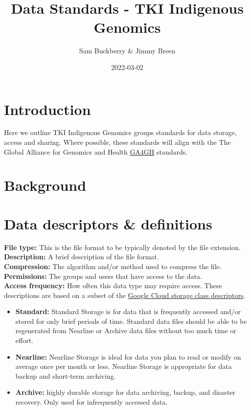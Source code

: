 \documentclass[
]{book}
\title{Data Standards - TKI Indigenous Genomics}
\author{Sam Buckberry \& Jimmy Breen}
\date{2022-03-02}
\providecommand{\tightlist}{%
  \setlength{\itemsep}{0pt}\setlength{\parskip}{0pt}}
\begin{document}
\maketitle

{
\setcounter{tocdepth}{1}
\tableofcontents
}
\hypertarget{introduction}{%
\chapter{Introduction}\label{introduction}}

Here we outline TKI Indigenous Genomics groups standards for data storage, access and sharing. Where possible, these standards will align with the The Global Alliance for Genomics and Health \href{https://www.ga4gh.org/}{GA4GH} standards.

\hypertarget{background}{%
\chapter{Background}\label{background}}

\hypertarget{data-descriptors-definitions}{%
\chapter{Data descriptors \& definitions}\label{data-descriptors-definitions}}

\textbf{File type:} This is the file format to be typically denoted by the file extension.\\

\textbf{Description:} A brief description of the file format.\\

\textbf{Compression:} The algorithm and/or method used to compress the file.\\

\textbf{Permissions:} The groups and users that have access to the data.\\

\textbf{Access frequency:} How often this data type may require access. These descriptions are based on a subset of the \href{https://cloud.google.com/storage/docs/storage-classes\#classes}{Google Cloud storage class descriptors}.

\begin{itemize}
\tightlist
\item
  \textbf{Standard:} Standard Storage is for data that is frequently accessed and/or stored for only brief periods of time. Standard data files should be able to be regenerated from Nearline or Archive data files without too much time or effort.
\item
  \textbf{Nearline:} Nearline Storage is ideal for data you plan to read or modify on average once per month or less. Nearline Storage is appropriate for data backup and short-term archiving.
\item
  \textbf{Archive:} highly durable storage for data archiving, backup, and disaster recovery. Only used for infrequently accessed data.
\end{itemize}
\end{document}
